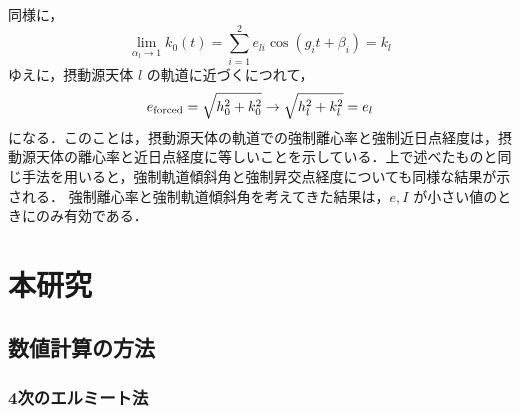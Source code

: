 \documentclass[11pt,a4paper,oneside,onecolumn]{jreport}
\begin{document}
同様に，
\begin{equation}
\lim_{\alpha_l \rightarrow 1} k_0 (t) = \sum_{i = 1}^2 e_{li} \cos (g_i t + \beta_i) = k_l
\end{equation}
ゆえに，摂動源天体 $l$ の軌道に近づくにつれて，
\begin{equation}
e_{\rm forced} = \sqrt{h_0^2 + k_0^2} \rightarrow \sqrt{h_l^2 + k_l^2} = e_l 
\end{equation}
になる．このことは，摂動源天体の軌道での強制離心率と強制近日点経度は，摂動源天体の離心率と近日点経度に等しいことを示している．上で述べたものと同じ手法を用いると，強制軌道傾斜角と強制昇交点経度についても同様な結果が示される．
強制離心率と強制軌道傾斜角を考えてきた結果は，$e, I$ が小さい値のときにのみ有効である．


\chapter{本研究}
\section{数値計算の方法}
\subsection{4次のエルミート法 \label{sec:Hermite}}
\end{document}
